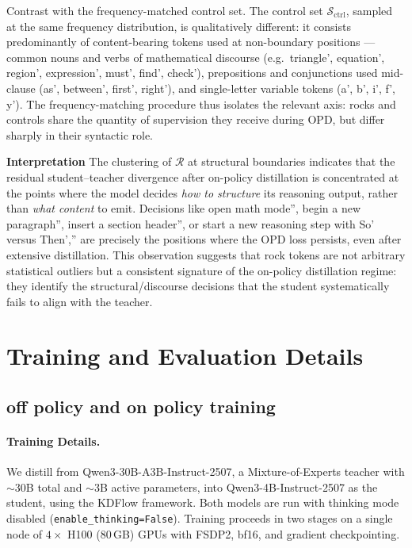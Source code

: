 \documentclass{article}
\begin{document}
Contrast with the frequency-matched control set. The control set $\mathcal{S}_{\text{ctrl}}$, sampled at the same frequency distribution, is qualitatively different: it consists predominantly of content-bearing tokens used at non-boundary positions — common nouns and verbs of mathematical discourse (e.g.\ triangle', equation', region', expression', must', find', check'), prepositions and conjunctions used mid-clause (as', between', first', right'), and single-letter variable tokens (a', b', i', f', y'). The frequency-matching procedure thus isolates the relevant axis: rocks and controls share the quantity of supervision they receive during OPD, but differ sharply in their syntactic role.

\textbf{Interpretation} The clustering of $\mathcal{R}$ at structural boundaries indicates that the residual student–teacher divergence after on-policy distillation is concentrated at the points where the model decides \emph{how to structure} its reasoning output, rather than \emph{what content} to emit. Decisions like open math mode'', begin a new paragraph'', insert a section header'', or start a new reasoning step with So' versus Then','' are precisely the positions where the OPD loss persists, even after extensive distillation. This observation suggests that rock tokens are not arbitrary statistical outliers but a consistent signature of the on-policy distillation regime: they identify the structural/discourse decisions that the student systematically fails to align with the teacher.
\section{Training and Evaluation Details}
\label{app:training_details}
\subsection{off policy and on policy training}

\paragraph{Training Details.} We distill from Qwen3-30B-A3B-Instruct-2507, a Mixture-of-Experts teacher with $\sim$30B total and $\sim$3B active parameters, into Qwen3-4B-Instruct-2507 as the student, using the KDFlow framework. Both models are run with thinking mode disabled (\texttt{enable\_thinking=False}). Training proceeds in two stages on a single node of $4\times$ H100 (80\,GB) GPUs with FSDP2, bf16, and gradient checkpointing.
  
\end{document}

